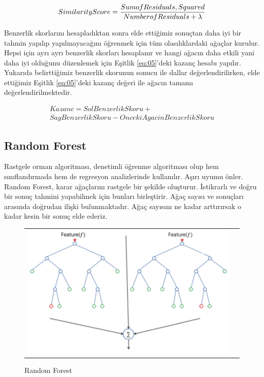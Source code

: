 \documentclass[conference]{IEEEtran}
\begin{document}
\begin{equation}
\label{eq:04}
\large Similarity Score=\frac{Sum of Residuals, Squared}{Number of Residuals + \lambda}
\end{equation}

\quad 	Benzerlik skorlarını hesapladıktan sonra elde ettiğimiz sonuçtan daha iyi bir tahmin yapılıp yapılmayacağını öğrenmek için tüm olasılıklardaki ağaçlar kurulur. Hepsi için ayrı ayrı benzerlik skorları hesaplanır ve hangi ağacın daha etkili yani daha iyi olduğunu düzenlemek için Eşitlik \ref{eq:05}'deki kazanç hesabı yapılır\cite{10}. Yukarıda belirttiğimiz benzerlik skorunun sonucu ile dallar değerlendirilirken, elde ettiğimiz Eşitlik \ref{eq:05}'deki kazanç değeri ile ağacın tamamı değerlendirilmektedir\cite{10}.

\begin{equation}
\label{eq:05}
\begin{matrix} Kazanc=SolBenzerlikSkoru+ \\ SagBenzerlikSkoru-OncekiAgacinBenzerlikSkoru \end{matrix}
\end{equation}

\subsection{\textbf{Random Forest}}
\quad Rastgele orman algoritması, denetimli öğrenme algoritması olup hem sınıflandırmada hem de regresyon analizlerinde kullanılır. Aşırı uyumu önler. Random Forest, karar ağaçlarını rastgele bir şekilde oluşturur. İstikrarlı ve doğru bir sonuç tahmini yapabilmek için bunları birleştirir. Ağaç sayısı ve sonuçları arasında doğrudan ilişki bulunmaktadır. Ağaç sayısını ne kadar arttırırsak o kadar kesin bir sonuç elde ederiz\cite{11}\cite{12}.

\begin{figure}[!h]
	\centering
	\begin{center}
		\begin{tabular}{cc}
			\includegraphics[scale=0.65]{pictures/pic_04.png}&
		\end{tabular}
	\end{center}
	\caption{Random Forest\cite{12}}
	\label{fig:04}
\end{figure}
\end{document}
